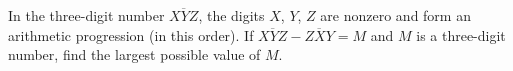 In the three-digit number $\overline{XYZ}$, the digits $X$, $Y$, $Z$ are nonzero and form an arithmetic progression (in this order). If $\overline{XYZ}-\overline{ZXY}=M$ and $M$ is a three-digit number, find the largest possible value of $M$.
